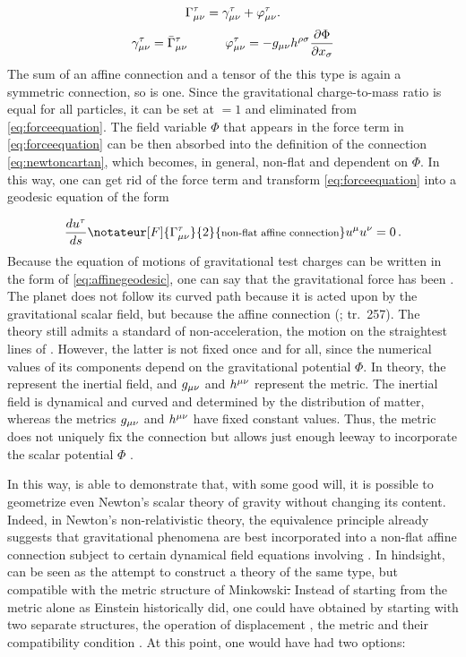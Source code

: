 \documentclass[final]{article}
\renewcommand{\Mink}{Minkowski\xspace}
\newcommand{\ctmr}{charge-to-mass ratio\xspace}
\newcommand{\Gtmnbar}{\ensuremath{\bar{\Gamma}\tmn}\xspace}
\renewcommand{\rzlp}[2]{(\cite[#1]{Reichenbach1928}; tr.\ #2)\xspace}
\begin{document}
\begin{equation*}
\Gamma^\tau_{\mu\nu} = \gamma^\tau_{\mu\nu} + \varphi^\tau_{\mu\nu}.
\end{equation*}
%
\begin{align}\label{eq:newtoncartan}
\gamma\tmn= \Gtmnbar & \quad \quad & \varphi\tmn = - g_{\mu \nu} h^{\rho \sigma} \frac{\partial \Phi}{\partial x_\sigma}
\end{align}
%
The sum of an affine connection and a tensor of the this type is again a symmetric connection, so \Gtmn is one. Since the gravitational \ctmr is equal for all particles, it can be set at $=1$ and eliminated from \cref{eq:forceequation}. The field variable $\Phi$ that appears in the force term in \cref{eq:forceequation} can be then absorbed into the definition of the connection \Gtmn \cref{eq:newtoncartan}, which becomes, in general, non-flat and dependent on $\Phi$. In this way, one can get rid of the force term and transform \cref{eq:forceequation} into a geodesic equation of the form

\begin{equation}
\label{eq:affinegeodesic} 
\frac{du^\tau}{\dap} \notateur[F]{\Gtmn}{2}{\texts{non-flat affine connection}} u^\mu u^\nu = 0\,.
\end{equation}
%
Because the equation of motions of gravitational test charges can be written in the form of \cref{eq:affinegeodesic}, one can say that the gravitational force has been . The planet does not follow its curved path because it is acted upon by the gravitational scalar field, but because the affine connection \Gtmn {} \rzlp{295}{257}. The theory still admits a standard of non-acceleration, the motion on the straightest lines of \Gtmn. However, the latter is not fixed once and for all, since the numerical values of its components depend on the gravitational potential $\Phi$. In  theory, the \Gtmn represent the inertial field, and $g_{\mu\nu}$ and $h^{\mu\nu}$ represent the metric. The inertial field \Gtmn is dynamical and curved and determined by the distribution of matter, whereas the metrics $g_{\mu\nu}$ and $h^{\mu\nu}$ have fixed constant values. Thus, the metric does not uniquely fix the connection \Gtmn but allows just enough leeway to incorporate the scalar potential $\Phi$ . 

 In this way, \citet{Friedrichs1928} is able to demonstrate that, with some good will, it is possible to geometrize even Newton's scalar theory of gravity without changing its content. Indeed, in Newton's non-relativistic theory, the equivalence principle already suggests that gravitational phenomena are best incorporated into a non-flat affine connection \Gtmn subject to certain dynamical field equations involving \ritea. In hindsight, \gr can be seen as the attempt to construct a theory of the same type, but compatible with the metric structure of \Mink \st. Instead of starting from the metric alone as Einstein historically did, one could have obtained \gr by starting with two separate structures, the operation of displacement \Gtmn, the metric \gmn and their compatibility condition \nonmetr \citep{Stachel2007}. At this point, one would have had two options:
\end{document}
